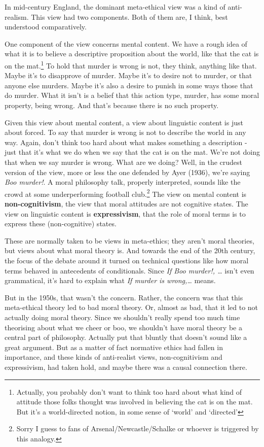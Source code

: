 \documentclass[
]{article}
\begin{document}
In mid-century England, the dominant meta-ethical view was a kind of
anti-realism. This view had two components. Both of them are, I think,
best understood comparatively.

One component of the view concerns mental content. We have a rough idea
of what it is to believe a descriptive proposition about the world, like
that the cat is on the mat.\footnote{Actually, you probably don't want
  to think too hard about what kind of attitude those folks thought was
  involved in believing the cat is on the mat. But it's a world-directed
  notion, in some sense of `world' and `directed'} To hold that murder
is wrong is not, they think, anything like that. Maybe it's to
disapprove of murder. Maybe it's to desire not to murder, or that anyone
else murders. Maybe it's also a desire to punish in some ways those that
do murder. What it isn't is a belief that this action type, murder, has
some moral property, being wrong. And that's because there is no such
property.

Given this view about mental content, a view about linguistic content is
just about forced. To say that murder is wrong is not to describe the
world in any way. Again, don't think too hard about what makes something
a description - just that it's what we do when we say that the cat is on
the mat. We're not doing that when we say murder is wrong. What are we
doing? Well, in the crudest version of the view, more or less the one
defended by Ayer (1936), we're saying \emph{Boo murder!}. A moral
philosophy talk, properly interpreted, sounds like the crowd at some
underperforming football club.\footnote{Sorry I guess to fans of
  Arsenal/Newcastle/Schalke or whoever is triggered by this analogy.}
The view on mental content is \textbf{non-cognitivism}, the view that
moral attitudes are not cognitive states. The view on linguistic content
is \textbf{expressivism}, that the role of moral terms is to express
these (non-cognitive) states.

These are normally taken to be views in meta-ethics; they aren't moral
theories, but views about what moral theory is. And towards the end of
the 20th century, the focus of the debate around it turned on technical
questions like how moral terms behaved in antecedents of conditionals.
Since \emph{If Boo murder!, \ldots{}} isn't even grammatical, it's hard
to explain what \emph{If murder is wrong,\ldots{}} means.

But in the 1950s, that wasn't the concern. Rather, the concern was that
this meta-ethical theory led to bad moral theory. Or, almost as bad,
that it led to not actually doing moral theory. Since we shouldn't
really spend too much time theorising about what we cheer or boo, we
shouldn't have moral theory be a central part of philosophy. Actually
put that bluntly that doesn't sound like a great argument. But as a
matter of fact normative ethics had fallen in importance, and these
kinds of anti-realist views, non-cognitivism and expressivism, had taken
hold, and maybe there was a causal connection there.
\end{document}
